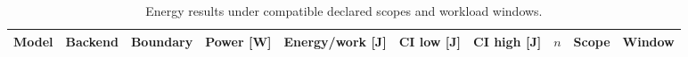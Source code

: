 \begin{table}[t]
\centering
\small
\caption{Energy results under compatible declared scopes and workload windows.}
\label{tab:energy-results}
\begin{tabular}{lrrrrrrrrr}
\toprule
Model & Backend & Boundary & Power [W] & Energy/work [J] & CI low [J] & CI high [J] & $n$ & Scope & Window \\
\midrule
\bottomrule
\end{tabular}
\end{table}
